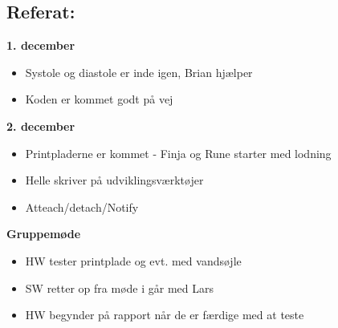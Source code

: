 \documentclass[a4paper,11pt,oneside]{memoir}
\newcommand{\R}{\ensuremath{\mathbb{R}}}
\begin{document}
\subsection{Referat:}
\textbf{1. december}
\begin{itemize}
\item Systole og diastole er inde igen, Brian hjælper 
\item Koden er kommet godt på vej 
\end{itemize}
\textbf{2. december}
\begin{itemize}
\item Printpladerne er kommet - Finja og Rune starter med lodning
\item Helle skriver på udviklingsværktøjer
\item Atteach/detach/Notify
\end{itemize}
\textbf{Gruppemøde}
\begin{itemize}
\item HW tester printplade og evt. med vandsøjle
\item SW retter op fra møde i går med Lars 
\item HW begynder på rapport når de er færdige med at teste
\end{itemize}


\newpage



\end{document}
